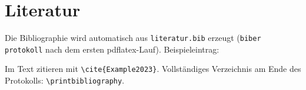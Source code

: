 \section{Literatur}
\label{cap:Literatur}

Die Bibliographie wird automatisch aus \texttt{literatur.bib} erzeugt (\texttt{biber protokoll} nach dem ersten pdflatex-Lauf). Beispieleintrag:

Im Text zitieren mit \texttt{\textbackslash cite\{Example2023\}}. Vollständiges Verzeichnis am Ende des Protokolls: \texttt{\textbackslash printbibliography}.
